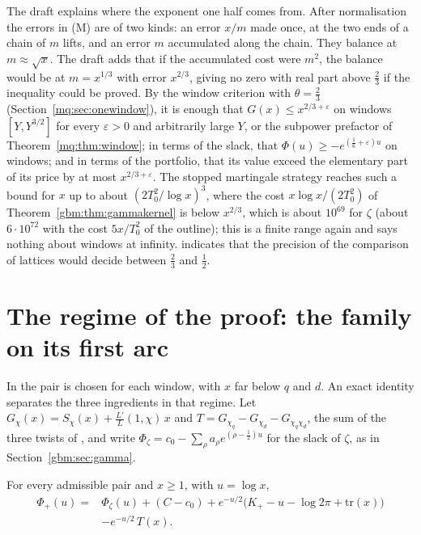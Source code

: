 The draft explains where the exponent one half comes from. After normalisation the errors in (M) are of two kinds: an error $x/m$ made once, at the two ends of a chain of $m$ lifts, and an error $m$ accumulated along the chain. They balance at $m\approx\sqrt x$. The draft adds that if the accumulated cost were $m^2$, the balance would be at $m=x^{1/3}$ with error $x^{2/3}$, giving no zero with real part above $\frac23$ if the inequality could be proved. By the window criterion with $\theta=\frac23$ (Section~\ref{mq:sec:onewindow}), it is enough that $G(x)\le x^{2/3+\varepsilon}$ on windows $[Y,Y^{3/2}]$ for every $\varepsilon>0$ and arbitrarily large $Y$, or the subpower prefactor of Theorem~\ref{mq:thm:window}; in terms of the slack, that $\Phi(u)\ge-e^{(\frac16+\varepsilon)u}$ on windows; and in terms of the portfolio, that its value exceed the elementary part of its price by at most $x^{2/3+\varepsilon}$. The stopped martingale strategy reaches such a bound for $x$ up to about $(2T_0^2/\log x)^3$, where the cost $x\log x/(2T_0^2)$ of Theorem~\ref{gbm:thm:gammakernel} is below $x^{2/3}$, which is about $10^{69}$ for $\zeta$ (about $6\cdot10^{72}$ with the cost $5x/T_0^2$ of the outline); this is a finite range again and says nothing about windows at infinity. \cite{Rub26} indicates that the precision of the comparison of lattices would decide between $\frac23$ and $\frac12$.

\section{The regime of the proof: the family on its first arc}\label{gbm:sec:regime}

In \cite{Rub26} the pair is chosen for each window, with $x$ far below $q$ and $d$. An exact identity separates the three ingredients in that regime. Let $G_\chi(x)=S_\chi(x)+\frac{L'}{L}(1,\chi)\,x$ and $T=G_{\chi_q}-G_{\chi_d}-G_{\chi_q\chi_d}$, the sum of the three twists of \cite{Rub26}, and write $\Phi_\zeta=c_0-\sum_\rho a_\rho e^{(\rho-\frac12)u}$ for the slack of $\zeta$, as in Section~\ref{gbm:sec:gamma}.

\begin{proposition}\label{gbm:prop:regime}
For every admissible pair and $x\ge1$, with $u=\log x$,
\[
\begin{aligned}
\Phi_+(u)={}&\Phi_\zeta(u)+(C-c_0)+e^{-u/2}\bigl(K_+-u-\log2\pi+\mathrm{tr}(x)\bigr)\\&-e^{-u/2}\,T(x).
\end{aligned}
\]
\end{proposition}

